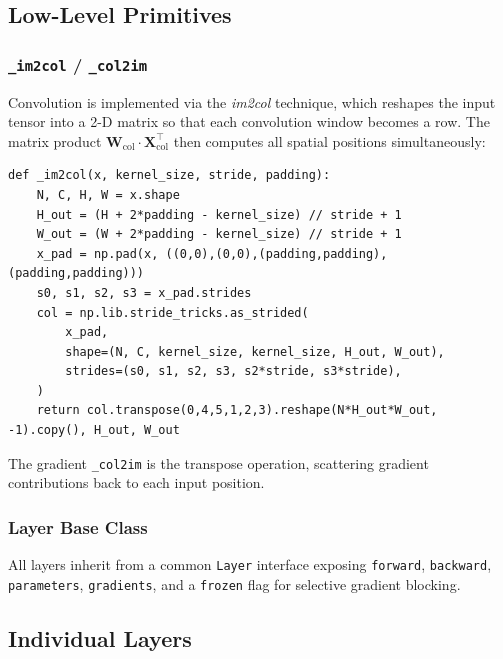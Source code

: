 \documentclass[12pt,a4paper]{report}
\begin{document}
\subsection{Low-Level Primitives}

\subsubsection{\texttt{\_im2col} / \texttt{\_col2im}}

Convolution is implemented via the \emph{im2col} technique, which reshapes the input tensor into a 2-D matrix so that each convolution window becomes a row. The matrix product $\mathbf{W}_{\text{col}} \cdot \mathbf{X}_{\text{col}}^{\top}$ then computes all spatial positions simultaneously:

\begin{lstlisting}[caption={im2col using NumPy stride tricks},label={lst:im2col}]
def _im2col(x, kernel_size, stride, padding):
    N, C, H, W = x.shape
    H_out = (H + 2*padding - kernel_size) // stride + 1
    W_out = (W + 2*padding - kernel_size) // stride + 1
    x_pad = np.pad(x, ((0,0),(0,0),(padding,padding),(padding,padding)))
    s0, s1, s2, s3 = x_pad.strides
    col = np.lib.stride_tricks.as_strided(
        x_pad,
        shape=(N, C, kernel_size, kernel_size, H_out, W_out),
        strides=(s0, s1, s2, s3, s2*stride, s3*stride),
    )
    return col.transpose(0,4,5,1,2,3).reshape(N*H_out*W_out, -1).copy(), H_out, W_out
\end{lstlisting}

The gradient \texttt{\_col2im} is the transpose operation, scattering gradient contributions back to each input position.

\subsubsection{Layer Base Class}

All layers inherit from a common \texttt{Layer} interface exposing \texttt{forward}, \texttt{backward}, \texttt{parameters}, \texttt{gradients}, and a \texttt{frozen} flag for selective gradient blocking.

\subsection{Individual Layers}
\end{document}
